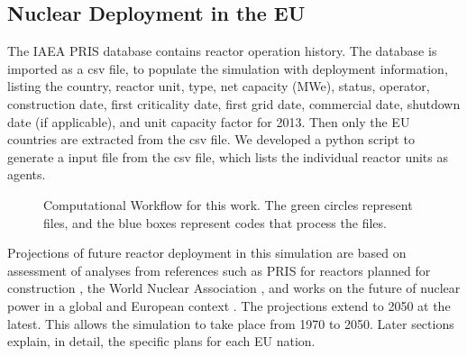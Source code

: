 \subsection{Nuclear Deployment in the \gls{EU}}


The \gls{IAEA} \gls{PRIS} database \cite{iaea_pris_2017} contains reactor
operation history.
The database is imported as a csv file, to populate the simulation
with deployment information, listing the country, reactor unit, type, net capacity (\gls{MWe}), status,
operator, construction date, first criticality date, first grid date, commercial date, shutdown
date (if applicable), and unit capacity factor for 2013. Then only the \gls{EU} countries are extracted
from the csv file. We developed a python script to generate a \Cyclus input file from the csv file,
which lists the individual reactor units as agents. 


\begin{figure}
        \centering
\caption{Computational Workflow for this work. The green circles represent files, and the blue
         boxes represent codes that process the files.}
\label{diag:comp}
\end{figure}


Projections of future reactor deployment in this simulation are based on
assessment of analyses from references such as \gls{PRIS} for reactors planned
for construction \cite{iaea_pris_2017}, the World Nuclear Association
\cite{world_nuclear_association_nuclear_2017}, and works on the future of
nuclear power in a global \cite{joskow_future_2012} and European context
\cite{hatch_politics_2015}.  The projections extend to 2050 at the latest. This
allows the simulation to take place from 1970 to 2050. Later sections explain,
in detail, the specific plans for each \gls{EU} nation.

